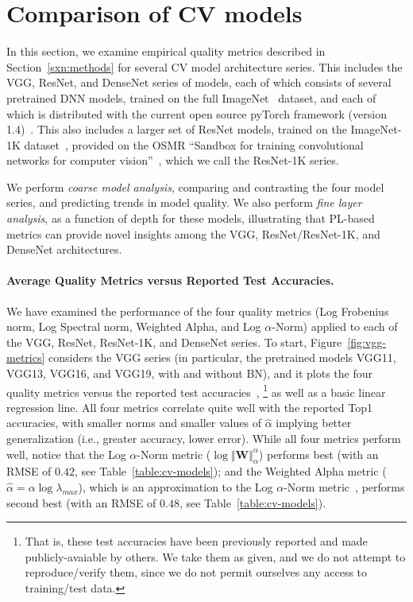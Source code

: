 \section{Comparison of CV models}
\label{sxn:cv}

In this section, we examine empirical quality metrics described in Section~\ref{sxn:methods} for several CV model architecture series.
This includes the VGG, ResNet, and DenseNet series of models, each of which consists of several pretrained DNN models, trained on the full ImageNet~\cite{imagenet} dataset, and each of which is distributed with the current open source pyTorch framework (version 1.4)~\cite{pytorch}.
This also includes a larger set of ResNet models, trained on the ImageNet-1K dataset~\cite{imagenet}, provided on the OSMR ``Sandbox for training convolutional networks for computer vision''~\cite{osmr}, which we call the ResNet-1K series.

We perform \emph{coarse model analysis}, comparing and contrasting the four model series, and predicting trends in model quality. 
We also perform \emph{fine layer analysis}, as a function of depth for these models, illustrating that PL-based metrics can provide novel insights among the VGG, ResNet/ResNet-1K, and DenseNet architectures. 


\paragraph{Average Quality Metrics versus Reported Test Accuracies.}

We have examined the performance of the four quality metrics (Log Frobenius norm, Log Spectral norm, Weighted Alpha, and Log $\alpha$-Norm) applied to each of the VGG, ResNet, ResNet-1K, and DenseNet series.
To start, Figure~\ref{fig:vgg-metrics} considers the VGG series (in particular, the pretrained models VGG11, VGG13, VGG16, and VGG19, with and without BN), and it plots the four quality metrics versus the reported test accuracies~\cite{pytorch},%
\footnote{That is, these test accuracies have been previously reported and made publicly-avaiable by others.  We take them as given, and we do not attempt to reproduce/verify them, since we do not permit ourselves any access to training/test data.}
as well as a basic linear regression line. 
All four metrics correlate quite well with the reported Top1 accuracies, with smaller norms and smaller values of $\hat{\alpha}$ implying better generalization (i.e., greater accuracy, lower error). 
While all four metrics perform well, notice that the Log $\alpha$-Norm metric ($\log\Vert\mathbf{W}\Vert_{\alpha}^{\alpha}$) performs best (with an RMSE of $0.42$, see Table~\ref{table:cv-models}); and the Weighted Alpha metric ($\hat\alpha =\alpha\log\lambda_{max} $), which is an approximation to the Log $\alpha$-Norm metric~\cite{MM20_unpub_work}, performs second best (with an RMSE of $0.48$, see Table~\ref{table:cv-models}).

